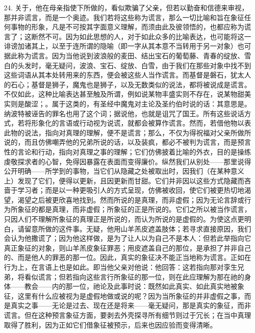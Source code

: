 24. 关于，他在母亲指使下所做的，看似欺骗了父亲，但若以勤奋和信德来审视，那并非谎言，而是一个奥迹。我们若将这些称为谎言，那么一切比喻和旨在象征任何事物的形象，凡是不可按其字面意义理解，而须由此及彼领悟的，也都应称为谎言了；这断然不可。因为如此思想的人，对于如此众多的比喻表达，也可能将这一诽谤加诸其上，以至于连所谓的隐喻（即一字从其本意不当转用于另一对象）也可据此称为谎言。因为当他说到波浪般的麦田、结出宝石的葡萄藤、青春的绽放、雪白的头发时，毫无疑问，波浪、宝石、绽放、白雪，由于我们在那些对象中找不到这些词语从其本处转用来的东西，便会被这些人当作谎言。而基督是磐石，犹太人的石心；基督是狮子，魔鬼也是狮子，以及无数类似的说法，都将被说成是谎言。不仅如此，这种比喻表达甚至触及所谓，例如说某物丰盛实则不存在，说某物甜美实则是酸涩；。属于这类的，有圣经中魔鬼对主论及圣约伯时说的话：其意思是。纳波特被诬告的罪名也用了这个词；据说他，也就是诅咒了国王。所有这些说话方式，若将形象化的言语或行动视为说谎，就都会被算作谎言。然而，若借他物以表此物的说法，指向对真理的理解，便不是谎言；那么，不仅为得祝福对父亲所做所说的，而且仿佛嘲弄他的兄弟所说的话，以及装疯，都必不被判为谎言，而是预言性的言论和行动，指向对真理之事的理解；它们仿佛披着比喻的外衣，目的是操练虔敬探求者的心智，免得因暴露在表面而变得廉价。纵然我们从别处——那里说得公开明确——所学到的事物，当它们从隐藏之处被取出时，因我们（在某种意义上）发现了它们，便得以更新，且因更新而甘甜。它们并非因以这些方式隐藏而吝啬于学习者；而是以一种更吸引人的方式呈现，仿佛被收回，使它们被更热切地渴望，渴望之后被更欣喜地找到。然而所说的是真理，而非虚假；因为无论言辞或行为所象征的都是真理，而非虚假；所象征的正是所说的。它们之所以被当作谎言，只因人们不理解所象征的真理正是所说的，而认为所说的是虚假的。为使这点更明白，请留意所做的这件事。无疑，他用山羊羔皮遮盖肢体；若寻求直接原因，我们会认为他撒谎了；因为他这样做，是为了让人以为自己不是本人：但若此举指向它真正象征的对象，则山羊羔皮象征罪恶；用皮遮盖自己的那位，是承担了并非自己的、而是他人的罪恶的那一位。因此，真实的象征决不能正当地称为谎言。正如在行为上，在言语上也是如此。即当他父亲对他说：他回答：这若指向那对孪生兄弟，将看似谎言；但若指向这些言行所象征的那一位，则在此应理解为那在祂的身体——教会——内的那一位，祂论及此事时说：既然如此真实、如此真实地被象征，这里有什么应被视为是虚假地做或说的呢？因为当所象征的并非虚假之事，而是真实之事——无论是过去、现在还是将来——毫无疑问，那是真实的象征，而非谎言。但在这种预言象征方面，要剥去外壳探寻所有细节则过于冗长；在当中真理取得了胜利，因为正如它们借象征被预示，后来也因应验而变得清晰。\par

